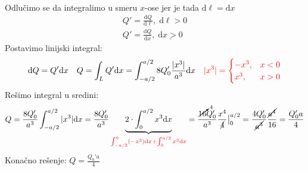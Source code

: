 \begin{figure}[h]
    \centering
    
\end{figure}
\\
Odlu\v{c}imo se da integralimo u smeru $x$-ose jer je tada $\mathrm d\ell = \mathrm d x$
\begin{align*}
    Q' = \frac{\mathrm d Q}{\mathrm d\ell},\; \mathrm d \ell > 0\\
    Q' = \frac{\mathrm d Q}{\mathrm d x},\; \underline{\mathrm d x > 0}
\end{align*}
Postavimo linijski integral:
\begin{align*}
    \mathrm dQ = Q'\mathrm dx 
    && Q = \int_L Q'\mathrm dx = \int_{-a/2}^{a/2} 8Q_0'\frac{|x^3|}{a^3}\mathrm dx
    && {\color{red} |x^3| = \begin{cases}
        -x^3, & x < 0\\
        x^3, & x > 0
    \end{cases}}
\end{align*}
Re\v{s}imo integral u sredini:
\begin{align*}
Q = \frac{8Q_0'}{a^3}\int_{-a/2}^{a/2} |x^3|\mathrm d x 
= \frac{8 Q_0'}{a^3} \underbrace{2\cdot\int_0^{a/2} x^3\mathrm d x}_{\color{red}\int_{-a/2}^0  (-x^3)\mathrm dx + \int_0^{a/2} x^3\mathrm d x} = \frac{\cancelto{4}{16}Q_0'}{a^3}\frac{x^4}{\cancel{4}}\big|_0^{a/2} = \frac{4Q_0'}{\cancel{a^3}}\frac{\cancel{a^4}}{16} = \frac{Q_0' a}{4}
\end{align*}
Kona\v{c}no re\v{s}enje: $\boxed{Q = \frac{Q_0' a}{4}}$
